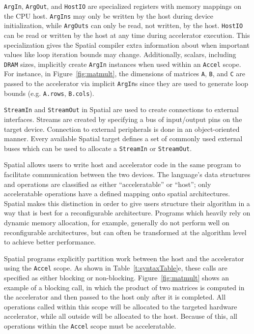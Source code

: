 \texttt{\small{ArgIn}}, \texttt{\small{ArgOut}}, and \texttt{\small{HostIO}} are specialized registers with memory mappings on the CPU host.
\texttt{\small{ArgIns}} may only be written by the host during device initialization, while \texttt{\small{ArgOuts}} can only be read, not written, by the host.
\texttt{\small{HostIO}} can be read or written by the host at any time during accelerator execution.
This specialization gives the Spatial compiler extra information about when important values like loop iteration bounds may change.
Additionally, scalars, including \texttt{\small{DRAM}} sizes, implicitly create \texttt{\small{ArgIn}} instances when used within an \texttt{\small{Accel}} scope. For instance, in Figure~\ref{fig:matmult}, the dimensions of matrices \texttt{\small{A}}, \texttt{\small{B}}, and \texttt{\small{C}} are passed to the accelerator via implicit \texttt{\small{ArgIn}}s
since they are used to generate loop bounds (e.g. \texttt{\small{A.rows}}, \texttt{\small{B.cols}}).


\texttt{\small{StreamIn}} and \texttt{\small{StreamOut}} in Spatial are used to create connections to external interfaces.
Streams are created by specifying a bus of input/output pins on the target device.
Connection to external peripherals is done in an object-oriented manner. Every available Spatial target defines a set of commonly used external buses which can be used to allocate a \texttt{\small{StreamIn}} or \texttt{\small{StreamOut}}. %

Spatial allows users to write host and accelerator code in the same program to facilitate communication between the two devices.
The language's data structures and operations are classified as either ``acceleratable'' or ``host''; only acceleratable operations have a defined mapping onto spatial architectures.
Spatial makes this distinction in order to give users structure their algorithm in a way that is best for a reconfigurable architecture.
Programs which heavily rely on dynamic memory allocation, for example, generally do not perform well on reconfigurable architectures, but can often be transformed at the algorithm level to achieve better performance.



Spatial programs explicitly partition work between the host and the accelerator using the \texttt{\small{Accel}} scope. As shown in Table~\ref{t:syntaxTable}e, these calls are specified as either blocking or non-blocking.  Figure~\ref{fig:matmult} shows an example of a blocking call, in which the product of two
matrices is computed in the accelerator and then passed to the host only after it is completed.
All operations called within this scope will be allocated to the targeted hardware accelerator, while all outside will be allocated to the host.
Because of this, all operations within the \texttt{\small{Accel}} scope must be acceleratable.

